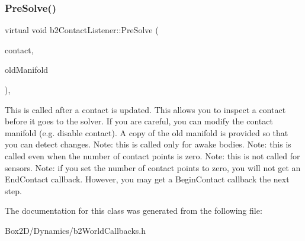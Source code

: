 \subsubsection{\texorpdfstring{Pre\+Solve()}{PreSolve()}}
{\footnotesize\ttfamily virtual void b2\+Contact\+Listener\+::\+Pre\+Solve (\begin{DoxyParamCaption}\item[{\hyperlink{classb2_contact}{b2\+Contact} $\ast$}]{contact,  }\item[{const \hyperlink{structb2_manifold}{b2\+Manifold} $\ast$}]{old\+Manifold }\end{DoxyParamCaption})\hspace{0.3cm}{\ttfamily [inline]}, {\ttfamily [virtual]}}

This is called after a contact is updated. This allows you to inspect a contact before it goes to the solver. If you are careful, you can modify the contact manifold (e.\+g. disable contact). A copy of the old manifold is provided so that you can detect changes. Note\+: this is called only for awake bodies. Note\+: this is called even when the number of contact points is zero. Note\+: this is not called for sensors. Note\+: if you set the number of contact points to zero, you will not get an End\+Contact callback. However, you may get a Begin\+Contact callback the next step. 

The documentation for this class was generated from the following file\+:\begin{DoxyCompactItemize}
\item 
Box2\+D/\+Dynamics/b2\+World\+Callbacks.\+h\end{DoxyCompactItemize}
